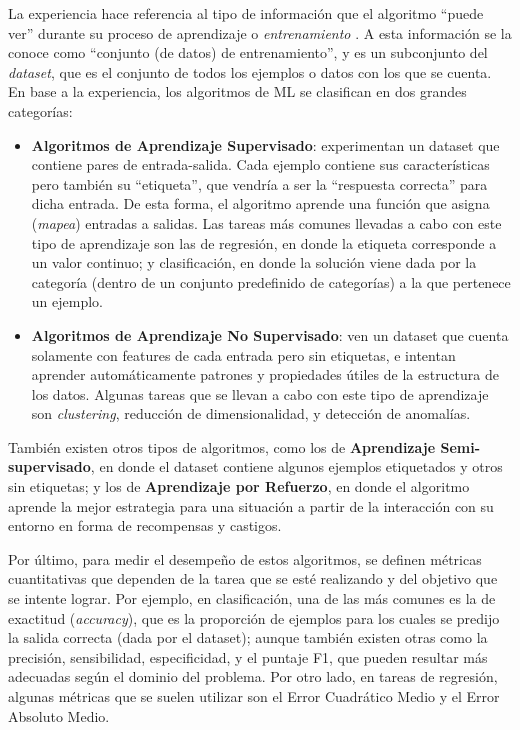 \documentclass[../../main.tex]{subfiles}
\begin{document}
La experiencia hace referencia al tipo de información que el algoritmo ``puede ver''
durante su proceso de aprendizaje o \textit{entrenamiento} \cite{hands-on-ML-sklearn-tf}.
A esta información se la conoce como ``conjunto (de datos) de entrenamiento'', y es un
subconjunto del \textit{dataset}, que es el conjunto de todos los ejemplos o datos con los
que se cuenta. En base a la experiencia, los algoritmos de ML se clasifican en dos grandes
categorías:
\begin{itemize}
    \item \textbf{Algoritmos de Aprendizaje Supervisado}: experimentan un dataset que
    contiene pares de entrada-salida. Cada ejemplo contiene sus características pero
    también su ``etiqueta'', que vendría a ser la ``respuesta correcta'' para dicha
    entrada. De esta forma, el algoritmo aprende una función que asigna (\textit{mapea})
    entradas a salidas. Las tareas más comunes llevadas a cabo con este tipo de
    aprendizaje son las de regresión, en donde la etiqueta corresponde a un valor
    continuo; y clasificación, en donde la solución viene dada por la categoría (dentro de
    un conjunto predefinido de categorías) a la que pertenece un ejemplo.
    \item \textbf{Algoritmos de Aprendizaje No Supervisado}: ven un dataset que cuenta
    solamente con features de cada entrada pero sin etiquetas, e intentan aprender
    automáticamente patrones y propiedades útiles de la estructura de los datos. Algunas
    tareas que se llevan a cabo con este tipo de aprendizaje son \textit{clustering},
    reducción de dimensionalidad, y detección de anomalías.
\end{itemize}
También existen otros tipos de algoritmos, como los de \textbf{Aprendizaje
Semi-supervisado}, en donde el dataset contiene algunos ejemplos etiquetados y otros sin
etiquetas; y los de \textbf{Aprendizaje por Refuerzo}, en donde el algoritmo aprende la
mejor estrategia para una situación a partir de la interacción con su entorno en forma de
recompensas y castigos.

Por último, para medir el desempeño de estos algoritmos, se definen métricas cuantitativas
que dependen de la tarea que se esté realizando y del objetivo que se intente lograr. Por
ejemplo, en clasificación, una de las más comunes es la de exactitud (\textit{accuracy}),
que es la proporción de ejemplos para los cuales se predijo la salida correcta (dada por
el dataset); aunque también existen otras como la precisión, sensibilidad, especificidad,
y el puntaje F1, que pueden resultar más adecuadas según el dominio del problema. Por otro
lado, en tareas de regresión, algunas métricas que se suelen utilizar son el Error
Cuadrático Medio y el Error Absoluto Medio.
\end{document}
